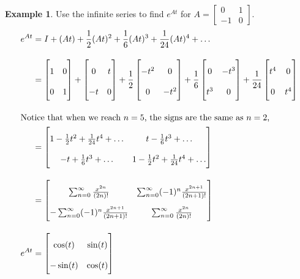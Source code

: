 \documentclass[12pt, letterpaper]{article}
\newcommand{\DefinitionSpace}{\vspace{15px}}
\theoremstyle{definition}
\newtheorem{example}{Example}
\begin{document}
	\DefinitionSpace
	\begin{example}
		Use the infinite series to find $e^{At}$ for $A = \begin{bmatrix}0 & 1\\-1 & 0\end{bmatrix}$.
			\begin{align*}
				e^{At} &= I  + (At) + \frac12 (At)^2 + \frac16 (At)^3 + \frac{1}{24} (At)^4 + \ldots \\[1em]
				       &= \begin{bmatrix}1&0\\ 0&1\end{bmatrix} + \begin{bmatrix}0&t\\ -t&0\end{bmatrix} + \frac12\begin{bmatrix}-t^2&0\\ 0&-t^2\end{bmatrix}+ \frac16\begin{bmatrix}0&-t^3\\ t^3&0\end{bmatrix} + \frac{1}{24}\begin{bmatrix}t^4&0\\ 0&t^4\end{bmatrix} \\[1em]
				\intertext{Notice that when we reach $n=5$, the signs are the same as $n=2$,}
				       &=  \renewcommand\arraystretch{2}\begin{bmatrix}
					      	1 - \frac12 t^2 + \frac{1}{24}t^4 + \ldots & t - \frac{1}{6}t^3+ \ldots\\
					      	-t + \frac16 t^3 + \ldots                  & 1 - \frac12 t^2 + \frac{1}{24}t^4 + \ldots
					       \end{bmatrix}\\[1em]
					   &= \renewcommand\arraystretch{2}\begin{bmatrix}
						   \sum_{n=0}^{\infty}\frac{x^{2n}}{(2n)!} & \sum_{n=0}^{\infty} (-1)^n \frac{x^{2n+1}}{(2n+1)!}\\
						   -\sum_{n=0}^{\infty} (-1)^n \frac{x^{2n+1}}{(2n+1)!}                 & \sum_{n=0}^{\infty}\frac{x^{2n}}{(2n)!}
						   \end{bmatrix}\\[1em]
					e^{At} &=\begin{bmatrix}\cos(t) & \sin(t) \\ -\sin(t) & \cos(t)\end{bmatrix}
			\end{align*}
	\end{example}
\end{document}
